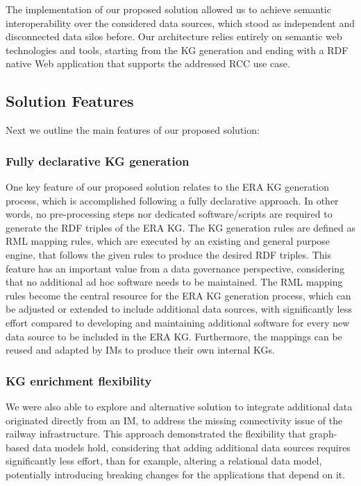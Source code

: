 The implementation of our proposed solution %
allowed us to achieve semantic interoperability
over the considered data sources,
which stood as independent and disconnected data silos before.
Our architecture relies entirely on semantic web technologies and tools,
starting from the KG generation %
and ending with a RDF native Web application
that supports the addressed RCC use case.

\subsection{Solution Features}
Next we outline the main features of our proposed solution:

\subsubsection{Fully declarative KG generation}
One key feature of our proposed solution
relates to the ERA KG generation process,
which is accomplished following a fully declarative approach.
In other words, no pre-processing steps nor dedicated software/scripts
are required to generate the RDF triples of the ERA KG.
The KG generation rules are defined as RML mapping rules,
which are executed by an existing and general purpose engine,
that follows the given rules to produce the desired RDF triples.
This feature has an important value from a data governance perspective,
considering that no additional ad hoc software needs to be maintained.
The RML mapping rules become the central resource for the ERA KG generation process,
which can be adjusted or extended to include additional data sources,
with significantly less effort compared to developing and maintaining additional software
for every new data source to be included in the ERA KG.
Furthermore, the mappings can be reused and adapted by IMs
to produce their own internal KGs.

\subsubsection{KG enrichment flexibility}
We were also able to explore and alternative solution
to integrate additional data originated directly from an IM,
to address the missing connectivity issue of the railway infrastructure.
This approach demonstrated the flexibility
that graph-based data models hold,
considering that adding additional data sources
requires significantly less effort,
than for example, altering a relational data model,
potentially introducing breaking changes for the applications that depend on it.

